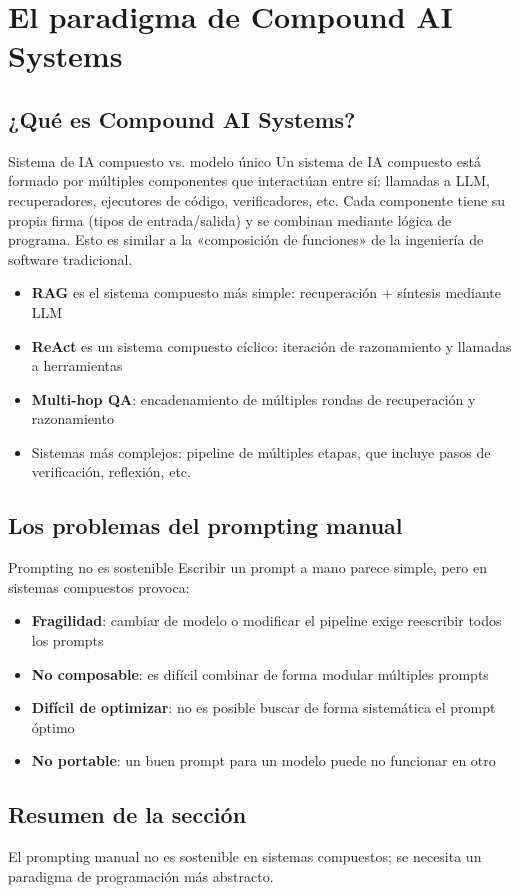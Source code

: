 \section{El paradigma de Compound AI Systems}

\subsection{¿Qué es Compound AI Systems?}

\begin{knowledgebox}{Sistema de IA compuesto vs. modelo único}
Un sistema de IA compuesto está formado por múltiples componentes que interactúan entre sí: llamadas a LLM, recuperadores, ejecutores de código, verificadores, etc. Cada componente tiene su propia firma (tipos de entrada/salida) y se combinan mediante lógica de programa. Esto es similar a la «composición de funciones» de la ingeniería de software tradicional.
\end{knowledgebox}

\begin{itemize}
    \item \textbf{RAG} es el sistema compuesto más simple: recuperación + síntesis mediante LLM
    \item \textbf{ReAct} es un sistema compuesto cíclico: iteración de razonamiento y llamadas a herramientas
    \item \textbf{Multi-hop QA}: encadenamiento de múltiples rondas de recuperación y razonamiento
    \item Sistemas más complejos: pipeline de múltiples etapas, que incluye pasos de verificación, reflexión, etc.
\end{itemize}

\subsection{Los problemas del prompting manual}

\begin{warningbox}{Prompting no es sostenible}
Escribir un prompt a mano parece simple, pero en sistemas compuestos provoca:
\begin{itemize}
    \item \textbf{Fragilidad}: cambiar de modelo o modificar el pipeline exige reescribir todos los prompts
    \item \textbf{No composable}: es difícil combinar de forma modular múltiples prompts
    \item \textbf{Difícil de optimizar}: no es posible buscar de forma sistemática el prompt óptimo
    \item \textbf{No portable}: un buen prompt para un modelo puede no funcionar en otro
\end{itemize}
\end{warningbox}

\subsection{Resumen de la sección}

El prompting manual no es sostenible en sistemas compuestos; se necesita un paradigma de programación más abstracto.

